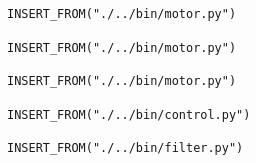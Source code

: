 \documentclass[twoside,a4]{report}
\begin{document}
\begin{Verbatim}[frame=single,fontsize=\footnotesize]
INSERT_FROM("./../bin/motor.py")
\end{Verbatim}
\begin{Verbatim}[frame=single,fontsize=\footnotesize]
INSERT_FROM("./../bin/motor.py")
\end{Verbatim}
\begin{Verbatim}[frame=single,fontsize=\footnotesize]
INSERT_FROM("./../bin/motor.py")
\end{Verbatim}
\begin{Verbatim}[frame=single,fontsize=\footnotesize]
INSERT_FROM("./../bin/control.py")
\end{Verbatim}
\begin{Verbatim}[frame=single,fontsize=\footnotesize]
INSERT_FROM("./../bin/filter.py")
\end{Verbatim}
\end{document}
